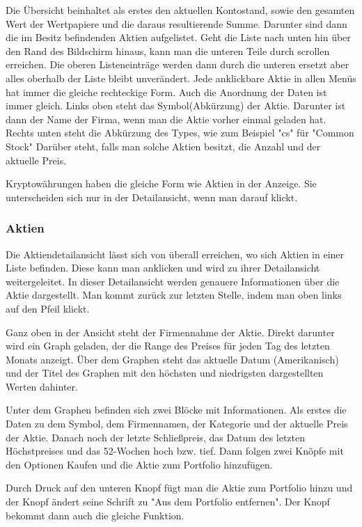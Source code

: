 \documentclass[10pt]{scrartcl}
\begin{document}
Die Übersicht beinhaltet als erstes den aktuellen Kontostand, sowie den gesamten Wert der Wertpapiere und die daraus resultierende Summe. Darunter sind dann die im Besitz befindenden Aktien aufgelistet. Geht die Liste nach unten hin über den Rand des Bildschirm hinaus, kann man die unteren Teile durch scrollen erreichen. Die oberen Listeneinträge werden dann durch die unteren ersetzt aber alles oberhalb der Liste bleibt unverändert.
Jede anklickbare Aktie in allen Menüs hat immer die gleiche rechteckige Form. Auch die Anordnung der Daten ist immer gleich. Links oben steht das Symbol(Abkürzung) der Aktie. Darunter ist dann der Name der Firma, wenn man die Aktie vorher einmal geladen hat. Rechts unten steht die Abkürzung des Types, wie zum Beispiel "cs" für "Common Stock" Darüber steht, falls man solche Aktien besitzt, die Anzahl und der aktuelle Preis.

Kryptowährungen haben die gleiche Form wie Aktien in der Anzeige. Sie unterscheiden sich nur in der Detailansicht, wenn man darauf klickt.

	



\subsubsection{Aktien}
Die Aktiendetailansicht lässt sich von überall erreichen, wo sich Aktien in einer Liste befinden. Diese kann man anklicken und wird zu ihrer Detailansicht weitergeleitet. In dieser Detailansicht werden genauere Informationen über die Aktie dargestellt. Man kommt zurück zur letzten Stelle, indem man oben links auf den Pfeil klickt.

Ganz oben in der Ansicht steht der Firmennahme der Aktie. Direkt darunter wird ein Graph geladen, der die Range des Preises für jeden Tag des letzten Monats anzeigt. Über dem Graphen steht das aktuelle Datum (Amerikanisch) und der Titel des Graphen mit den höchsten und niedrigsten dargestellten Werten dahinter. 

Unter dem Graphen befinden sich zwei Blöcke mit Informationen. Als erstes die Daten zu dem Symbol, dem Firmennamen, der Kategorie und der aktuelle Preis der Aktie. Danach noch der letzte Schließpreis, das Datum des letzten Höchstpreises und das 52-Wochen hoch bzw. tief.
Dann folgen zwei Knöpfe mit den Optionen Kaufen und die Aktie zum Portfolio hinzufügen.

Durch Druck auf den unteren Knopf fügt man die Aktie zum Portfolio hinzu und der Knopf ändert seine Schrift zu "Aus dem Portfolio entfernen". Der Knopf bekommt dann auch die gleiche Funktion.
\end{document}
